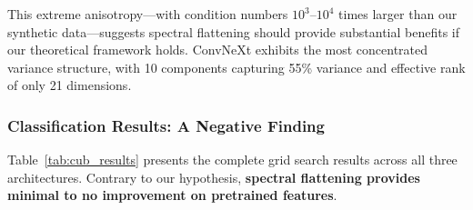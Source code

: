 \documentclass[11pt]{article}
\begin{document}
This extreme anisotropy---with condition numbers $10^3$--$10^4$ times larger than our synthetic data---suggests spectral flattening should provide substantial benefits if our theoretical framework holds. ConvNeXt exhibits the most concentrated variance structure, with 10 components capturing 55\% variance and effective rank of only 21 dimensions.

\subsubsection{Classification Results: A Negative Finding}

Table~\ref{tab:cub_results} presents the complete grid search results across all three architectures. Contrary to our hypothesis, \textbf{spectral flattening provides minimal to no improvement on pretrained features}.
\end{document}
